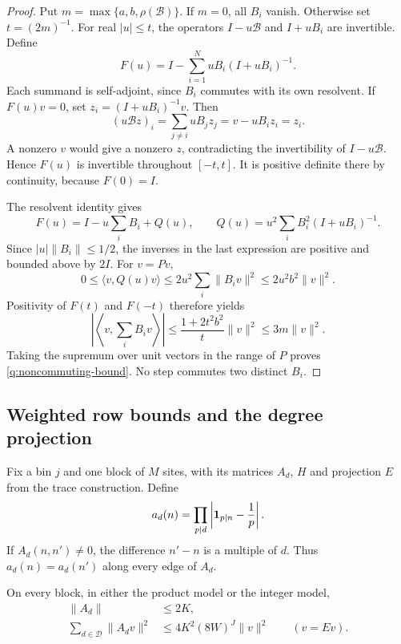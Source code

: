 \begin{proof}
Put $m=\max\{a,b,\rho(\mathscr B)\}$. If $m=0$, all $B_i$ vanish.
Otherwise set $t=(2m)^{-1}$. For real $|u|\le t$, the operators
$I-u\mathscr B$ and $I+uB_i$ are invertible. Define
\[
 F(u)=I-\sum_{i=1}^N uB_i(I+uB_i)^{-1}.
\]
Each summand is self-adjoint, since $B_i$ commutes with its own
resolvent. If $F(u)v=0$, set $z_i=(I+uB_i)^{-1}v$. Then
\[
 (u\mathscr Bz)_i
 =\sum_{j\ne i}uB_jz_j
 =v-uB_i z_i=z_i.
\]
A nonzero $v$ would give a nonzero $z$, contradicting the invertibility
of $I-u\mathscr B$. Hence $F(u)$ is invertible throughout $[-t,t]$.
It is positive definite there by continuity, because $F(0)=I$.

The resolvent identity gives
\[
 F(u)=I-u\sum_i B_i+Q(u),\qquad
 Q(u)=u^2\sum_i B_i^2(I+uB_i)^{-1}.
\]
Since $|u|\|B_i\|\le1/2$, the inverses in the last expression are
positive and bounded above by $2I$. For $v=Pv$,
\[
 0\le\langle v,Q(u)v\rangle
 \le2u^2\sum_i\|B_i v\|^2
 \le2u^2b^2\|v\|^2.
\]
Positivity of $F(t)$ and $F(-t)$ therefore yields
\[
 \left|\left\langle v,\sum_i B_i v\right\rangle\right|
 \le \frac{1+2t^2b^2}{t}\|v\|^2
 \le3m\|v\|^2.
\]
Taking the supremum over unit vectors in the range of $P$ proves
\eqref{q:noncommuting-bound}. No step commutes two distinct $B_i$.
\end{proof}

\subsection{Weighted row bounds and the degree projection}

Fix a bin $j$ and one block of $M$ sites, with its matrices $A_d$, $H$
and projection $E$ from the trace construction. Define
\[
 a_d(n)=\prod_{p\mid d}\left|\mathbf 1_{p\mid n}-\frac1p\right|.
\]
If $A_d(n,n')\ne0$, the difference $n'-n$ is a multiple of $d$.
Thus $a_d(n)=a_d(n')$ along every edge of $A_d$.

\begin{lemma}\label{q:weighted-rows}
On every block, in either the product model or the integer model,
\begin{align}
 \|A_d\|&\le2K,\label{q:single-operator}\\
 \sum_{d\in\mathcal D}\|A_d v\|^2
 &\le4K^2(8W)^J\|v\|^2\qquad(v=Ev).
 \label{q:square-operators}
\end{align}
\end{lemma}

